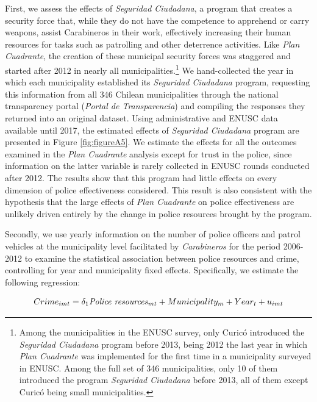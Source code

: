 First, we assess the effects of \textit{Seguridad Ciudadana}, a program that creates a security force that, while they do not have the competence to apprehend or carry weapons, assist Carabineros in their work, effectively increasing their human resources for tasks such as patrolling and other deterrence activities. Like \emph{Plan Cuadrante}, the creation of these municipal security forces was staggered and started after 2012 in nearly all municipalities.\footnote{Among the municipalities in the ENUSC survey, only Curic\'o introduced the \textit{Seguridad Ciudadana} program before 2013, being 2012 the last year in which \emph{Plan Cuadrante} was implemented for the first time in a municipality surveyed in ENUSC. Among the full set of 346 municipalities, only 10 of them introduced the program \textit{Seguridad Ciudadana} before 2013, all of them except Curic\'o being small municipalities.} We hand-collected the year in which each municipality established its \textit{Seguridad Ciudadana} program, requesting this information from all 346 Chilean municipalities through the national transparency portal (\emph{Portal de Transparencia}) and compiling the responses they returned into an original dataset. Using administrative and ENUSC data available until 2017, the estimated effects of \textit{Seguridad Ciudadana} program are presented in Figure \ref{fig:figureA5}. We estimate the effects for all the outcomes examined in the \emph{Plan Cuadrante} analysis except for trust in the police, since information on the latter variable is rarely collected in ENUSC rounds conducted after 2012. The results show that this program had little effects on every dimension of police effectiveness considered. This result is also consistent with the hypothesis that the large effects of \emph{Plan Cuadrante} on police effectiveness are unlikely driven entirely by the change in police resources brought by the program.


\clearpage

Secondly, we use yearly information on the number of police officers and patrol vehicles at the municipality level facilitated by \textit{Carabineros} for the period 2006-2012 to examine the statistical association between police resources and crime, controlling for year and municipality fixed effects. Specifically, we estimate the following regression:

\begin{equation}
Crime_{imt}=  \delta_{1} \mbox{\textit{Police resources}}_{mt} +  Municipality_{m}   +      Year_{t} +  u_{imt}
\label{eq:correlation}
\end{equation}

